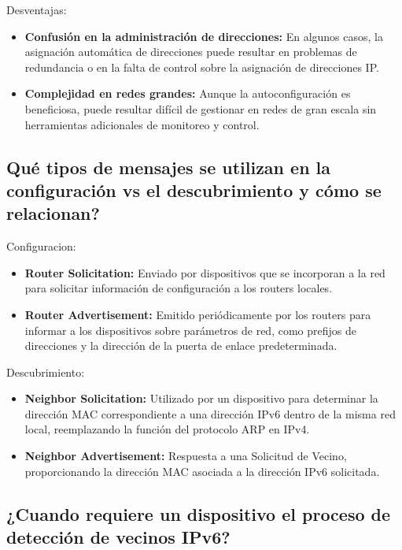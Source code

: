 \documentclass[a4paper,12pt]{article}
\begin{document}
Desventajas:\\
  \begin{itemize}
    \item {\textbf{Confusión en la administración de direcciones:} En algunos casos, la asignación automática de direcciones puede resultar en problemas de redundancia o en la falta de control sobre la asignación de direcciones IP.}
    \item {\textbf{Complejidad en redes grandes:} Aunque la autoconfiguración es beneficiosa, puede resultar difícil de gestionar en redes de gran escala sin herramientas adicionales de monitoreo y control.}
  \end{itemize}
\bigskip
\subsection{Qué tipos de mensajes se utilizan en la configuración vs el descubrimiento y cómo se relacionan?}


Configuracion:\\
  \begin{itemize}
    \item {\textbf{Router Solicitation:} Enviado por dispositivos que se incorporan a la red para solicitar información de configuración a los routers locales.}
    \item {\textbf{Router Advertisement:} Emitido periódicamente por los routers para informar a los dispositivos sobre parámetros de red, como prefijos de direcciones y la dirección de la puerta de enlace predeterminada.}
  \end{itemize}

\bigskip

Descubrimiento:\\
  \begin{itemize}
    \item {\textbf{Neighbor Solicitation:} Utilizado por un dispositivo para determinar la dirección MAC correspondiente a una dirección IPv6 dentro de la misma red local, reemplazando la función del protocolo ARP en IPv4. }
    \item {\textbf{Neighbor Advertisement:} Respuesta a una Solicitud de Vecino, proporcionando la dirección MAC asociada a la dirección IPv6 solicitada.}
  \end{itemize}

\subsection{¿Cuando requiere un dispositivo el proceso de detección de vecinos IPv6? }
\end{document}
